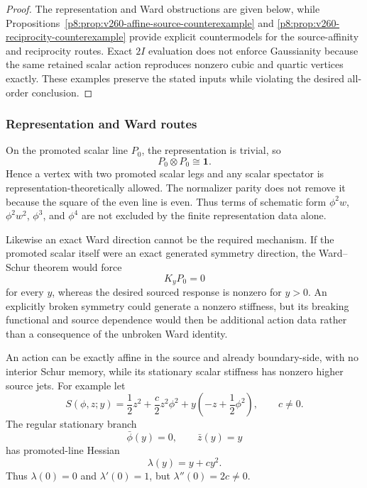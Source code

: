 \documentclass[12pt,a4paper]{article}
\begin{document}
\begin{proof}
The representation and Ward obstructions are given below, while
Propositions~\ref{p8:prop:v260-affine-source-counterexample} and
\ref{p8:prop:v260-reciprocity-counterexample} provide explicit countermodels
for the source-affinity and reciprocity routes.  Exact \(2I\) evaluation does
not enforce Gaussianity because the same retained scalar action reproduces
nonzero cubic and quartic vertices exactly.  These examples preserve the
stated inputs while violating the desired all-order conclusion.
\end{proof}

\subsubsection{Representation and Ward routes}
On the promoted scalar line \(P_0\), the representation is trivial, so
\[
 P_0\otimes P_0\cong\mathbf1.
\]
Hence a vertex with two promoted scalar legs and any scalar spectator is
representation-theoretically allowed.  The normalizer parity does not remove
it because the square of the even line is even.  Thus terms of schematic form
\(\phi^2w\), \(\phi^2w^2\), \(\phi^3\), and \(\phi^4\) are not excluded by
the finite representation data alone.

Likewise an exact Ward direction cannot be the required mechanism.  If the
promoted scalar itself were an exact generated symmetry direction, the
Ward--Schur theorem would force
\[
 K_yP_0=0
\]
for every \(y\), whereas the desired sourced response is nonzero for
\(y>0\).  An explicitly broken symmetry could generate a nonzero stiffness,
but its breaking functional and source dependence would then be additional
action data rather than a consequence of the unbroken Ward identity.

\begin{proposition}
\label{p8:prop:v260-affine-source-counterexample}
An action can be exactly affine in the source and already boundary-side, with
no interior Schur memory, while its stationary scalar stiffness has nonzero
higher source jets.  For example let
\begin{equation}
 \label{p8:eq:v260-affine-source-counterexample-action}
 S(\phi,z;y)
 =\frac12z^2+\frac c2z^2\phi^2
 +y\left(-z+\frac12\phi^2\right),
 \qquad c\ne0.
\end{equation}
The regular stationary branch
\[
 \bar\phi(y)=0,\qquad \bar z(y)=y
\]
has promoted-line Hessian
\begin{equation}
 \label{p8:eq:v260-affine-source-counterexample-stiffness}
 \boxed{\lambda(y)=y+cy^2.}
\end{equation}
Thus \(\lambda(0)=0\) and \(\lambda'(0)=1\), but
\(\lambda''(0)=2c\ne0\).
\end{proposition}
\end{document}

